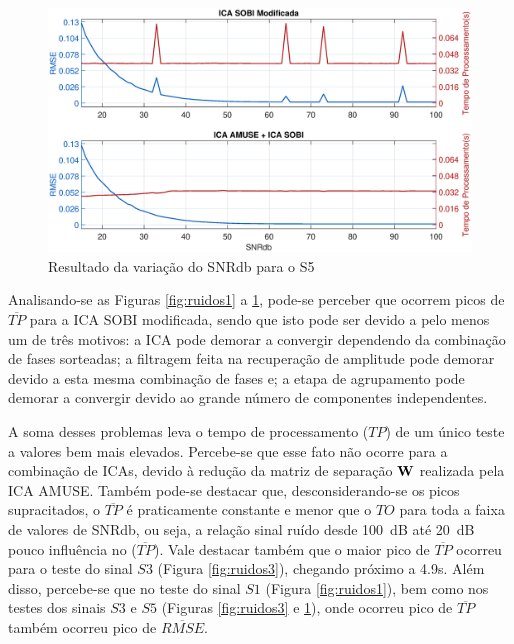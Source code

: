 \documentclass[a4paper,12pt]{monografia}
\theoremstyle{plain}
\theoremstyle{definition}
\theoremstyle{remark}
\begin{document}
\begin{figure}[!htb]
    \begin{center}
    \advance\leftskip -1.5cm
    \includegraphics[scale=0.45]{imagens/Sinal5Ruidov2.eps}
    \caption{Resultado da variação do SNRdb para o S5}
    \label{fig:ruidos5}    
    \end{center}
\end{figure}

Analisando-se as Figuras \ref{fig:ruidos1} a \ref{fig:ruidos5}, pode-se perceber que ocorrem picos de $\overline{TP}$ para a ICA SOBI modificada, sendo que isto pode ser devido a pelo menos um de três motivos:
a ICA pode demorar a convergir dependendo da combinação de fases sorteadas; a filtragem feita na recuperação de amplitude pode demorar devido a esta mesma combinação de fases e; a etapa de agrupamento pode demorar a convergir devido ao grande número de componentes independentes.

A soma desses problemas leva o tempo de processamento ($TP$) de um único teste a valores bem mais elevados. Percebe-se que esse fato não ocorre para a combinação de ICAs, devido à redução da matriz de separação $\bf W$ realizada pela ICA AMUSE. Também pode-se destacar que, desconsiderando-se os picos supracitados, o $\overline{TP}$ é praticamente constante e menor que o $TO$ para toda a faixa de valores de SNRdb, ou seja, a relação sinal ruído desde 100~dB até 20~dB pouco influência no  ($\overline{TP}$). Vale destacar também que o maior pico de $\overline{TP}$ ocorreu para o teste do sinal $S3$ (Figura \ref{fig:ruidos3}), chegando próximo a 4.9s. Além disso, percebe-se que no teste do sinal $S1$ (Figura \ref{fig:ruidos1}), bem como nos testes dos sinais $S3$ e $S5$ (Figuras \ref{fig:ruidos3} e \ref{fig:ruidos5}), onde ocorreu pico de $\overline{TP}$ também ocorreu pico de $\overline{RMSE}$. 
\end{document}
